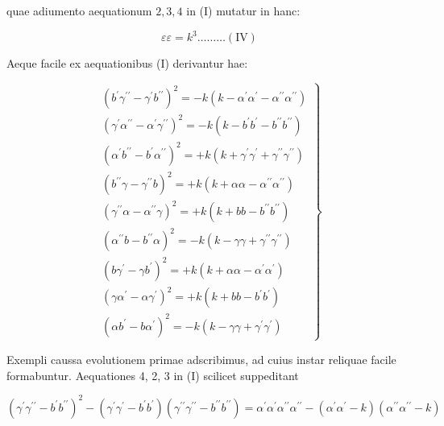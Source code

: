 \documentclass[10pt]{article}
\begin{document}
quae adiumento aequationum \(2,3,4\) in (I) mutatur in hanc:

\[
\varepsilon \varepsilon=k^{3} \ldots \ldots \ldots(\mathrm{IV})
\]

Aeque facile ex aequationibus (I) derivantur hae:

\[
\left.\begin{array}{l}
\left(b^{\prime} \gamma^{\prime \prime}-\gamma^{\prime} b^{\prime \prime}\right)^{2}=-k\left(k-\alpha^{\prime} \alpha^{\prime}-\alpha^{\prime \prime} \alpha^{\prime \prime}\right) \\
\left(\gamma^{\prime} \alpha^{\prime \prime}-\alpha^{\prime} \gamma^{\prime \prime}\right)^{2}=-k\left(k-b^{\prime} b^{\prime}-b^{\prime \prime} b^{\prime \prime}\right) \\
\left(\alpha^{\prime} b^{\prime \prime}-b^{\prime} \alpha^{\prime \prime}\right)^{2}=+k\left(k+\gamma^{\prime} \gamma^{\prime}+\gamma^{\prime \prime} \gamma^{\prime \prime}\right) \\
\left(b^{\prime \prime} \gamma-\gamma^{\prime \prime} b\right)^{2}=+k\left(k+\alpha \alpha-\alpha^{\prime \prime} \alpha^{\prime \prime}\right) \\
\left(\gamma^{\prime \prime} \alpha-\alpha^{\prime \prime} \gamma\right)^{2}=+k\left(k+b b-b^{\prime \prime} b^{\prime \prime}\right) \\
\left(\alpha^{\prime \prime} b-b^{\prime \prime} \alpha\right)^{2}=-k\left(k-\gamma \gamma+\gamma^{\prime \prime} \gamma^{\prime \prime}\right) \\
\left(b \gamma^{\prime}-\gamma b^{\prime}\right)^{2}=+k\left(k+\alpha \alpha-\alpha^{\prime} \alpha^{\prime}\right) \\
\left(\gamma \alpha^{\prime}-\alpha \gamma^{\prime}\right)^{2}=+k\left(k+b b-b^{\prime} b^{\prime}\right) \\
\left(\alpha b^{\prime}-b \alpha^{\prime}\right)^{2}=-k\left(k-\gamma \gamma+\gamma^{\prime} \gamma^{\prime}\right)
\end{array}\right\}
\]

Exempli caussa evolutionem primae adscribimus, ad cuius instar reliquae facile formabuntur. Aequationes 4, 2, 3 in (I) scilicet suppeditant

\[
\left(\gamma^{\prime} \gamma^{\prime \prime}-b^{\prime} b^{\prime \prime}\right)^{2}-\left(\gamma^{\prime} \gamma^{\prime}-b^{\prime} b^{\prime}\right)\left(\gamma^{\prime \prime} \gamma^{\prime \prime}-b^{\prime \prime} b^{\prime \prime}\right)=\alpha^{\prime} \alpha^{\prime} \alpha^{\prime \prime} \alpha^{\prime \prime}-\left(\alpha^{\prime} \alpha^{\prime}-k\right)\left(\alpha^{\prime \prime} \alpha^{\prime \prime}-k\right)
\]
\end{document}

